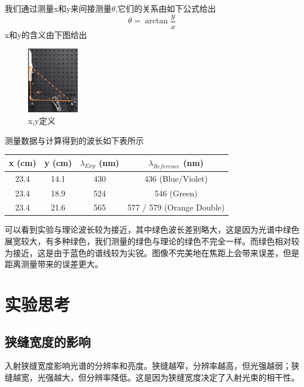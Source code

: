 \documentclass{ctexart}
\begin{document}
我们通过测量x和y来间接测量$\theta$,它们的关系由如下公式给出
\begin{equation}
    \theta =\arctan \frac{y}{x}
\end{equation}
x和y的含义由下图给出
\begin{figure}[H]
    \centering
    \includegraphics[width=0.2\textwidth,height=0.3\textwidth]{pictures/xy示意图.png}
    \caption{x,y定义}
\end{figure}
测量数据与计算得到的波长如下表所示
\begin{table}[h]
    \centering
    \begin{tabular}{|c|c|c|c|}
        \hline
        \rowcolor{yellow!25} x (cm) & y (cm) & $\lambda_{Exp}$ (nm) & $\lambda_{Reference}$ (nm) \\
        \hline
        23.4   & 14.1   & 430                  & 436 (Blue/Violet)           \\
        \hline
        23.4   & 18.9   & 524                  & 546 (Green)                 \\
        \hline
        23.4   & 21.6   & 565                  & 577 / 579 (Orange Double)   \\
        \hline
    \end{tabular}
\end{table}

可以看到实验与理论波长较为接近，其中绿色波长差别略大，这是因为光谱中绿色展宽较大，有多种绿色，我们测量的绿色与理论的绿色不完全一样。而绿色相对较为接近，这是由于蓝色的谱线较为尖锐。图像不完美地在焦距上会带来误差，但是距离测量带来的误差更大。
\section{实验思考}

\subsection{狭缝宽度的影响}
入射狭缝宽度影响光谱的分辨率和亮度。狭缝越窄，分辨率越高，但光强越弱；狭缝越宽，光强越大，但分辨率降低。这是因为狭缝宽度决定了入射光束的相干性。
\end{document}

